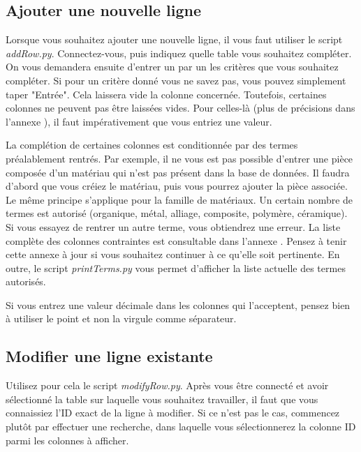 \documentclass[12pt,a4paper]{article}
\begin{document}
    \bigskip
    \subsection{Ajouter une nouvelle ligne}\label{ajoutligne}

        Lorsque vous souhaitez ajouter une nouvelle ligne, il vous faut utiliser le script \emph{addRow.py}.
        Connectez-vous, puis indiquez quelle table vous souhaitez compléter.
        On vous demandera ensuite d'entrer un par un les critères que vous souhaitez compléter.
        Si pour un critère donné vous ne savez pas, vous pouvez simplement taper "Entrée".
        Cela laissera vide la colonne concernée.
        Toutefois, certaines colonnes ne peuvent pas être laissées vides. Pour celles-là (plus de précisions dans
        l'annexe ), il faut impérativement que vous entriez une valeur.

        La complétion de certaines colonnes est conditionnée par des termes préalablement rentrés. Par exemple,
        il ne vous est pas possible d'entrer une pièce composée d'un matériau qui n'est pas présent dans la base
        de données. Il faudra d'abord que vous créiez le matériau, puis vous pourrez ajouter la pièce associée.
        Le même principe s'applique pour la famille de matériaux. Un certain nombre de termes est autorisé (organique,
        métal, alliage, composite, polymère, céramique). Si vous essayez de rentrer un autre terme, vous obtiendrez une
        erreur. La liste complète des colonnes contraintes est consultable dans l'annexe .
        Pensez à tenir cette annexe à jour si vous souhaitez continuer à ce qu'elle soit pertinente.
        En outre, le script \emph{printTerms.py} vous permet d'afficher la liste actuelle des termes autorisés.

        Si vous entrez une valeur décimale dans les colonnes qui l'acceptent, pensez bien à utiliser le point et non la
        virgule comme séparateur.


    \bigskip
    \subsection{Modifier une ligne existante}\label{modificationligne}

        Utilisez pour cela le script \emph{modifyRow.py}.
        Après vous être connecté et avoir sélectionné la table sur laquelle vous souhaitez travailler,
        il faut que vous connaissiez l'ID exact de la ligne à modifier. Si ce n'est pas le cas,
        commencez plutôt par effectuer une recherche, dans laquelle vous sélectionnerez la colonne ID
        parmi les colonnes à afficher.
\end{document}
